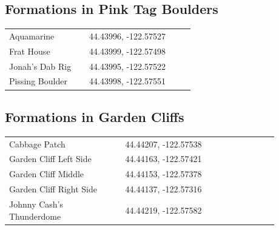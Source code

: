 \begin{flushleft}
\subsection{Formations in Pink Tag Boulders}
\begin{center}
\begin{supertabular}{p{0.38\linewidth}p{0.5\linewidth}}
Aquamarine & 44.43996, -122.57527 \\
Frat House & 44.43999, -122.57498 \\
Jonah's Dab Rig & 44.43995, -122.57522 \\
Pissing Boulder & 44.43998, -122.57551 \\
\end{supertabular}
\end{center}
\subsection{Formations in Garden Cliffs}
\begin{center}
\begin{supertabular}{p{0.38\linewidth}p{0.5\linewidth}}
Cabbage Patch & 44.44207, -122.57538 \\
Garden Cliff Left Side & 44.44163, -122.57421 \\
Garden Cliff Middle & 44.44153, -122.57378 \\
Garden Cliff Right Side & 44.44137, -122.57316 \\
Johnny Cash's Thunderdome & 44.44219, -122.57582 \\
\end{supertabular}
\end{center}

\end{flushleft}
